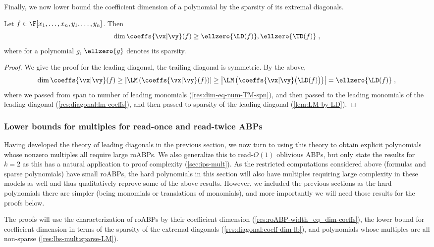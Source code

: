 \documentclass{toc}
\begin{document}
Finally, we now lower bound the coefficient dimension of a polynomial by the sparsity of its extremal diagonals.

\begin{corollarywp}\label{res:diagonal:coeff-dim-lb}
        Let $f\in\F[x_1,\ldots,x_n,y_1,\ldots,y_n]$.  Then
        \[
                \dim\coeffs{\vx|\vy}(f)\ge \ellzero{\LD(f)},\ellzero{\TD(f)}
                \;,
        \]
        where for a polynomial $g$, $\ellzero{g}$ denotes its sparsity.
\end{corollarywp}
\begin{proof}
        We give the proof for the leading diagonal, the trailing diagonal is symmetric.  By the above,
        \[
                \dim\coeffs{\vx|\vy}(f)
                \ge \left|\LM\left(\coeffs{\vx|\vy}(f)\right)\right|
                \ge \left|\LM\left(\coeffs{\vx|\vy}\big(\LD(f)\big)\right)\right|
                =  \ellzero{\LD(f)}
                \;,
        \]
        where we passed from span to number of leading monomials (\autoref{res:dim-eq-num-TM-spn}), and then passed to the leading monomials of the leading diagonal (\autoref{res:diagonal:lm-coeffs}), and then passed to sparsity of the leading diagonal (\autoref{lem:LM-by-LD}).
\end{proof}

\subsubsection{Lower bounds for multiples for read-once and read-twice ABPs}

Having developed the theory of leading diagonals in the previous section, we now turn to using this theory to obtain explicit polynomials whose nonzero multiples all require large roABPs. We also generalize this to read-$O(1)$ oblivious ABPs, but only state the results for $k=2$ as this has a natural application to proof complexity (\autoref{sec:ips-mult}).  As the restricted computations considered above (\sumpowsum formulas and sparse polynomials) have small roABPs, the hard polynomials in this section will also have multiples requiring large complexity in these models as well and thus qualitatively reprove some of the above results. However, we included the previous sections as the hard polynomials there are simpler (being monomials or translations of monomials), and more importantly we will need those results for the proofs below.

The proofs will use the characterization of roABPs by their coefficient dimension (\autoref{res:roABP-width_eq_dim-coeffs}), the lower bound for coefficient dimension in terms of the sparsity of the extremal diagonals (\autoref{res:diagonal:coeff-dim-lb}), and polynomials whose multiples are all non-sparse (\autoref{res:lbs-mult:sparse-LM}).
\end{document}
